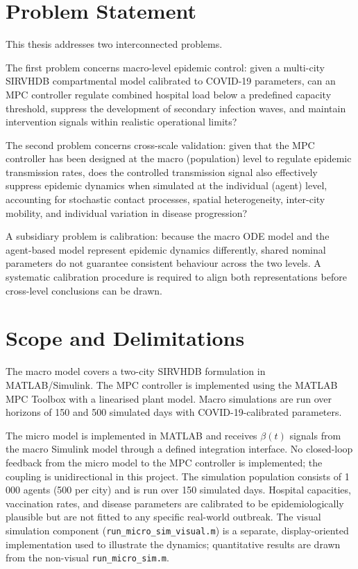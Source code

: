 \section{Problem Statement}
\label{sec:problem}

This thesis addresses two interconnected problems.

The first problem concerns macro-level epidemic control: given a multi-city SIRVHDB compartmental model calibrated to COVID-19 parameters, can an MPC controller regulate combined hospital load below a predefined capacity threshold, suppress the development of secondary infection waves, and maintain intervention signals within realistic operational limits?

The second problem concerns cross-scale validation: given that the MPC controller has been designed at the macro (population) level to regulate epidemic transmission rates, does the controlled transmission signal also effectively suppress epidemic dynamics when simulated at the individual (agent) level, accounting for stochastic contact processes, spatial heterogeneity, inter-city mobility, and individual variation in disease progression?

A subsidiary problem is calibration: because the macro ODE model and the agent-based model represent epidemic dynamics differently, shared nominal parameters do not guarantee consistent behaviour across the two levels.
A systematic calibration procedure is required to align both representations before cross-level conclusions can be drawn.

\section{Scope and Delimitations}
\label{sec:scope}

The macro model covers a two-city SIRVHDB formulation in MATLAB/Simulink.
The MPC controller is implemented using the MATLAB MPC Toolbox with a linearised plant model.
Macro simulations are run over horizons of 150 and 500 simulated days with COVID-19-calibrated parameters.

The micro model is implemented in MATLAB and receives $\beta(t)$ signals from the macro Simulink model through a defined integration interface.
No closed-loop feedback from the micro model to the MPC controller is implemented; the coupling is unidirectional in this project.
The simulation population consists of 1\,000 agents (500 per city) and is run over 150 simulated days.
Hospital capacities, vaccination rates, and disease parameters are calibrated to be epidemiologically plausible but are not fitted to any specific real-world outbreak.
The visual simulation component (\texttt{run\_micro\_sim\_visual.m}) is a separate, display-oriented implementation used to illustrate the dynamics; quantitative results are drawn from the non-visual \texttt{run\_micro\_sim.m}.

